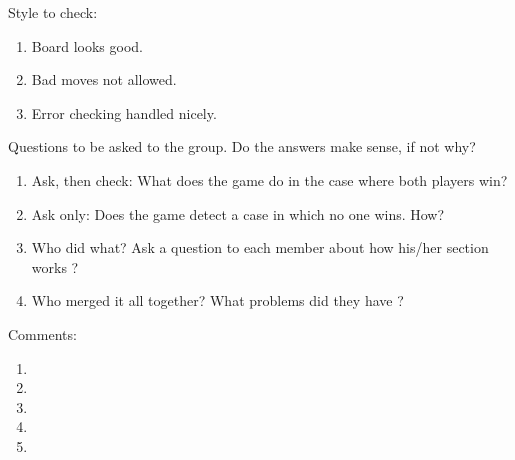 Style to check:
\begin{enumerate}
\item Board looks good.
\item Bad moves not allowed.  
\item Error checking handled nicely.
\end{enumerate}

Questions to be asked to the group. Do the answers make sense, if not why? 
\begin{enumerate}
\item Ask, then check:  What does the game do in the case where both players win?
\item Ask only: Does the game detect a case in which no one wins.  How?
\item Who did what?  Ask a question to each member about how his/her section
 works ?
\item Who merged it all together?  What problems did they have ?  
\end{enumerate}

Comments:
\begin{enumerate}
\item
\vspace{0.1in} 
\item
\vspace{0.1in} 
\item
\vspace{0.1in} 
\item
\vspace{0.1in} 
\item
\end{enumerate}


